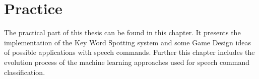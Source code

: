 \chapter{Practice}
The practical part of this thesis can be found in this chapter.
It presents the implementation of the Key Word Spotting system and some Game Design ideas of possible applications with speech commands. 
Further this chapter includes the evolution process of the machine learning approaches used for speech command classification.














